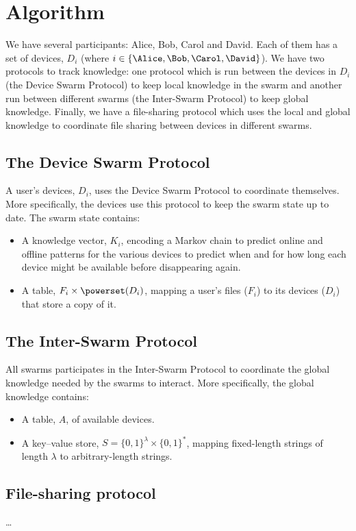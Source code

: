 \section{Algorithm}%
\label{Algorithm}


We have several participants: Alice, Bob, Carol and David.
Each of them has a set of devices, \(D_i\) (where \(i\in \{\Alice, \Bob, \Carol, 
  \David\}\)).
We have two protocols to track knowledge: one protocol which is run between the 
devices in \(D_i\) (the Device Swarm Protocol) to keep local knowledge in the 
swarm and another run between different swarms (the Inter-Swarm Protocol) to 
keep global knowledge.
Finally, we have a file-sharing protocol which uses the local and global 
knowledge to coordinate file sharing between devices in different swarms.

\subsection{The Device Swarm Protocol}%
\label{DeviceSwarmProtocol}

A user's devices, \(D_i\), uses the Device Swarm Protocol to coordinate 
themselves.
More specifically, the devices use this protocol to keep the swarm state up to 
date.
The swarm state contains:
\begin{itemize}
  \item A knowledge vector, \(K_i\), encoding a Markov chain to predict online 
    and offline patterns for the various devices to predict when and for how 
    long each device might be available before disappearing again.
  \item A table, \(F_i\times \powerset(D_i)\), mapping a user's files (\(F_i\)) 
    to its devices (\(D_i\)) that store a copy of it.
\end{itemize}


\subsection{The Inter-Swarm Protocol}%
\label{InterSwarmProtocol}

All swarms participates in the Inter-Swarm Protocol to coordinate the global 
knowledge needed by the swarms to interact.
More specifically, the global knowledge contains:
\begin{itemize}
  \item A table, \(A\), of available devices.
  \item A key--value store, \(S = \{0, 1\}^\lambda\times \{0, 1\}^*\), mapping 
    fixed-length strings of length \(\lambda\) to arbitrary-length strings.
\end{itemize}

\subsection{File-sharing protocol}

\dots
